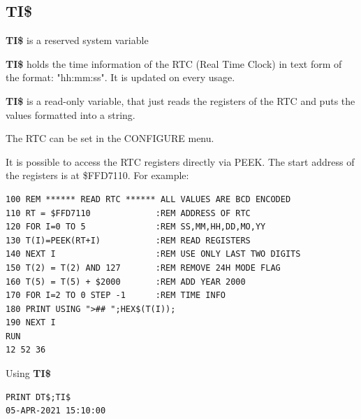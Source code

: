\subsection{TI\$}
\begin{description}[leftmargin=2cm,style=nextline]
\item [Format:] {\bf TI\$} is a reserved system variable
\item [Usage:]  {\bf TI\$} holds the time information of the RTC
                (Real Time Clock)
                in text form of the format:
                "hh:mm:ss".
                It is updated on every usage.

                {\bf TI\$} is a read-only variable, that just
                reads the registers of the RTC and puts the values
                formatted into a string.

                The RTC can be set in the CONFIGURE menu.

\item [Remarks:]
                It is possible to access the RTC registers directly
                via PEEK. The start address of the registers is at
                \$FFD7110. For example:

\begin{tcolorbox}[colback=black,coltext=white]
\verbatimfont{\codefont}
\begin{verbatim}
100 REM ****** READ RTC ****** ALL VALUES ARE BCD ENCODED
110 RT = $FFD7110             :REM ADDRESS OF RTC
120 FOR I=0 TO 5              :REM SS,MM,HH,DD,MO,YY
130 T(I)=PEEK(RT+I)           :REM READ REGISTERS
140 NEXT I                    :REM USE ONLY LAST TWO DIGITS
150 T(2) = T(2) AND 127       :REM REMOVE 24H MODE FLAG
160 T(5) = T(5) + $2000       :REM ADD YEAR 2000
170 FOR I=2 TO 0 STEP -1      :REM TIME INFO
180 PRINT USING ">## ";HEX$(T(I));
190 NEXT I
RUN
12 52 36
\end{verbatim}
\end{tcolorbox}

\item [Example:] Using {\bf TI\$}
\begin{tcolorbox}[colback=black,coltext=white]
\verbatimfont{\codefont}
\begin{verbatim}
PRINT DT$;TI$
05-APR-2021 15:10:00
\end{verbatim}
\end{tcolorbox}
\end{description}


